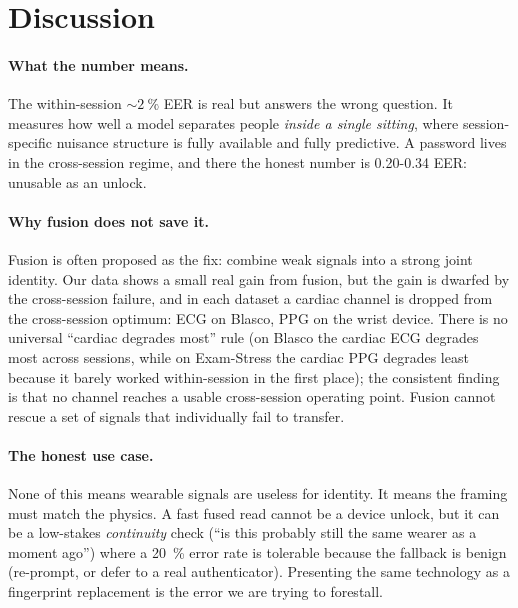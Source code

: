 \documentclass[11pt]{article}
\begin{document}
\section{Discussion}
\label{sec:discussion}

\paragraph{What the number means.} The within-session ${\sim}\SI{2}{\percent}$ EER is real but
answers the wrong question. It measures how well a model separates people \emph{inside a
single sitting}, where session-specific nuisance structure is fully available and fully
predictive. A password lives in the cross-session regime, and there the honest number is
\num{0.20}-\num{0.34} EER: unusable as an unlock.

\paragraph{Why fusion does not save it.} Fusion is often proposed as the fix: combine weak
signals into a strong joint identity. Our data shows a small real gain from fusion, but the
gain is dwarfed by the cross-session failure, and in each dataset a cardiac channel is dropped
from the cross-session optimum: ECG on Blasco, PPG on the wrist device. There is no universal
``cardiac degrades most'' rule (on Blasco the cardiac ECG degrades most across sessions, while
on Exam-Stress the cardiac PPG degrades least because it barely worked within-session in the
first place); the consistent finding is that no channel reaches a usable cross-session
operating point. Fusion cannot rescue a set of signals that individually fail to transfer.

\paragraph{The honest use case.} None of this means wearable signals are useless for identity.
It means the framing must match the physics. A fast fused read cannot be a device unlock, but
it can be a low-stakes \emph{continuity} check (``is this probably still the same wearer as
a moment ago'') where a \SI{20}{\percent} error rate is tolerable because the fallback is
benign (re-prompt, or defer to a real authenticator). Presenting the same technology as a
fingerprint replacement is the error we are trying to forestall.
\end{document}
